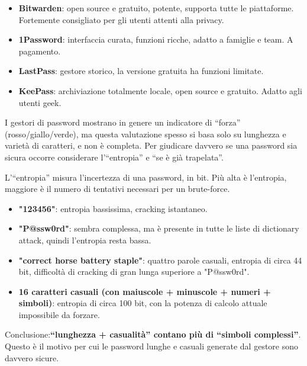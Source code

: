 
\begin{itemize}
  \item \textbf{Bitwarden}: open source e gratuito, potente, supporta tutte le piattaforme. Fortemente consigliato per gli utenti attenti alla privacy.
  \item \textbf{1Password}: interfaccia curata, funzioni ricche, adatto a famiglie e team. A pagamento.
  \item \textbf{LastPass}: gestore storico, la versione gratuita ha funzioni limitate.
  \item \textbf{KeePass}: archiviazione totalmente locale, open source e gratuito. Adatto agli utenti geek.
\end{itemize}


I gestori di password mostrano in genere un indicatore di “forza” (rosso/giallo/verde), ma questa valutazione spesso si basa solo su lunghezza e varietà di caratteri, e non è completa. Per giudicare davvero se una password sia sicura occorre considerare l'“entropia” e “se è già trapelata”.


L'“entropia” misura l'incertezza di una password, in bit. Più alta è l'entropia, maggiore è il numero di tentativi necessari per un brute-force.

\begin{itemize}
  \item \textbf{"123456"}: entropia bassissima, cracking istantaneo.
  \item \textbf{"P@ssw0rd"}: sembra complessa, ma è presente in tutte le liste di dictionary attack, quindi l'entropia resta bassa.
  \item \textbf{"correct horse battery staple"}: quattro parole casuali, entropia di circa 44 bit, difficoltà di cracking di gran lunga superiore a "P@ssw0rd".
  \item \textbf{16 caratteri casuali (con maiuscole + minuscole + numeri + simboli)}: entropia di circa 100 bit, con la potenza di calcolo attuale impossibile da forzare.
\end{itemize}

Conclusione:\textbf{“lunghezza + casualità” contano più di “simboli complessi”}. Questo è il motivo per cui le password lunghe e casuali generate dal gestore sono davvero sicure.

